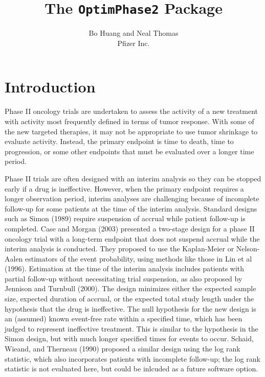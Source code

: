 \documentclass[12pt]{article}
\begin{document}
\title{The \texttt{OptimPhase2} Package}
\author{Bo Huang and Neal Thomas\\Pfizer Inc. }
\maketitle

\tableofcontents

\section{Introduction}
Phase II oncology trials are undertaken to  assess the activity of a new treatment with activity
most frequently defined in terms of tumor response. With some of the new targeted therapies, it may
not be appropriate to use tumor shrinkage to evaluate activity. Instead, the primary endpoint is
time to death, time to progression, or some other endpoints that must be evaluated over a longer
time period.

Phase II trials are often designed with an interim analysis so they can be stopped early if a drug
is ineffective. However, when the primary endpoint requires a longer observation period, interim
analyses are challenging because of incomplete follow-up for some patients at the time of the
interim analysis.  Standard designs such as Simon (1989) require suspension of accrual while
patient follow-up is completed.  Case and Morgan (2003) presented a two-stage design for a phase II
oncology trial with a long-term endpoint that does not suspend accrual while the interim analysis
is conducted.  They proposed to use the Kaplan-Meier or Nelson-Aalen estimators of the event
probability, using methods like those in Lin et al (1996). Estimation at the time of the interim
analysis includes patients with partial follow-up without necessitating trial suspension, as also
proposed by Jennison and Turnbull (2000).  The
design minimizes either the expected sample size, expected duration of accrual, or the expected
total study length under the hypothesis that the drug is ineffective. The null hypothesis for the
new design is an (assumed) known event-free rate within a specified time, which has been judged to
represent ineffective treatment.  This is similar to  the hypothesis in the Simon design, but with
much longer specified times for events to occur.  Schaid, Wieand, and Therneau (1990) proposed a
similar design using the log rank statistic, which also incorporates patients with incomplete
follow-up;  the log rank statistic is not evaluated here, but could be inlcuded as a future
software option.
\end{document}
